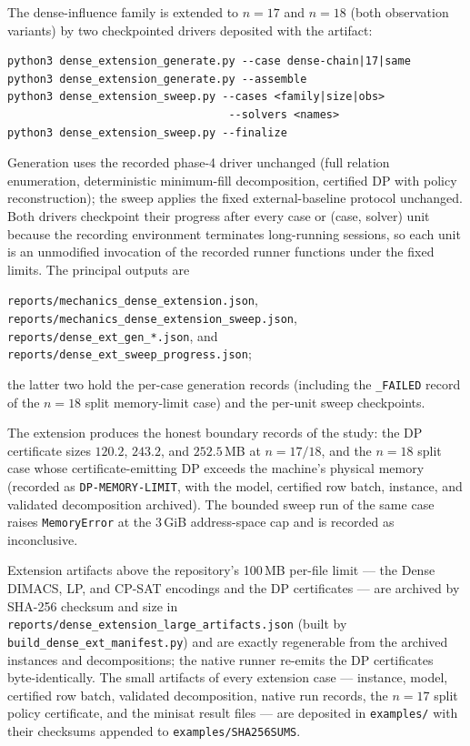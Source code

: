 The dense-influence family is extended to $n=17$ and $n=18$ (both
observation variants) by two checkpointed drivers deposited with the
artifact:
\begin{verbatim}
python3 dense_extension_generate.py --case dense-chain|17|same
python3 dense_extension_generate.py --assemble
python3 dense_extension_sweep.py --cases <family|size|obs>
                                  --solvers <names>
python3 dense_extension_sweep.py --finalize
\end{verbatim}
Generation uses the recorded phase-4 driver unchanged (full relation
enumeration, deterministic minimum-fill decomposition, certified DP with
policy reconstruction); the sweep applies the fixed external-baseline
protocol unchanged. Both drivers checkpoint their progress after every case
or (case, solver) unit because the recording environment terminates
long-running sessions, so each unit is an unmodified invocation of the
recorded runner functions under the fixed limits. The principal outputs are
\begin{center}
\footnotesize
\texttt{reports/mechanics\_dense\_extension.json},\\
\texttt{reports/mechanics\_dense\_extension\_sweep.json},\\
\texttt{reports/dense\_ext\_gen\_*.json}, and\\
\texttt{reports/dense\_ext\_sweep\_progress.json};
\end{center}
\noindent the latter two hold the per-case generation records (including the
\texttt{\_FAILED} record of the $n=18$ split memory-limit case) and the
per-unit sweep checkpoints.

The extension produces the honest boundary records of the study: the
DP certificate sizes $120.2$, $243.2$, and $252.5$\,MB at $n=17/18$, and
the $n=18$ split case whose certificate-emitting DP exceeds the machine's
physical memory (recorded as \texttt{DP-MEMORY-LIMIT}, with the model,
certified row batch, instance, and validated decomposition archived). The
bounded sweep run of the same case raises \texttt{MemoryError} at the
3\,GiB address-space cap and is recorded as inconclusive.

Extension artifacts above the repository's 100\,MB per-file limit --- the
Dense DIMACS, LP, and CP-SAT encodings and the DP certificates --- are
archived by SHA-256 checksum and size in
\texttt{reports/dense\_extension\_large\_artifacts.json} (built by
\texttt{build\_dense\_ext\_manifest.py}) and are exactly regenerable from
the archived instances and decompositions; the native runner re-emits the
DP certificates byte-identically. The small artifacts of every extension
case --- instance, model, certified row batch, validated decomposition,
native run records, the $n=17$ split policy certificate, and the minisat
result files --- are deposited in \texttt{examples/} with their checksums
appended to \texttt{examples/SHA256SUMS}.

